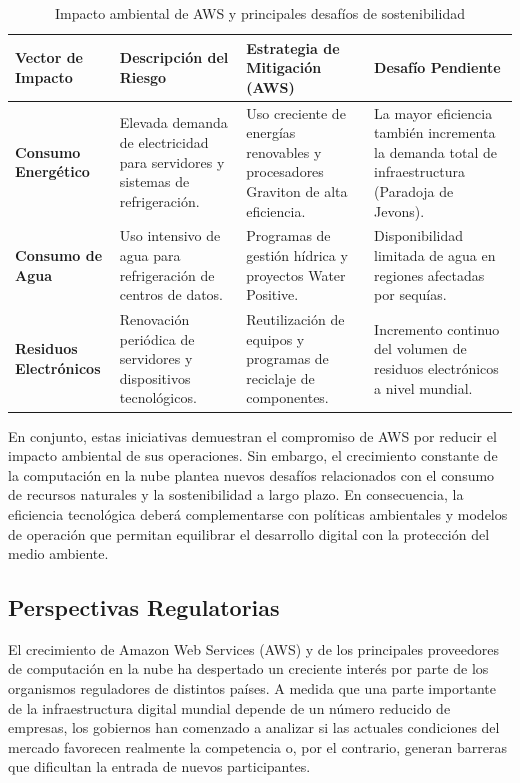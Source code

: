 \documentclass[12pt,a4paper]{article}
\begin{document}
\begin{table}[H]
\centering
\renewcommand{\arraystretch}{1.5}
\caption{Impacto ambiental de AWS y principales desafíos de sostenibilidad}
\label{tab:impacto_ambiental}
\begin{tabular}{>{\centering\arraybackslash}p{3cm} p{5cm} p{4.5cm} p{3.5cm}}
\toprule
\textbf{Vector de Impacto} &
\textbf{Descripción del Riesgo} &
\textbf{Estrategia de Mitigación (AWS)} &
\textbf{Desafío Pendiente} \\
\midrule

\textbf{Consumo Energético} &
Elevada demanda de electricidad para servidores y sistemas de refrigeración. &
Uso creciente de energías renovables y procesadores Graviton de alta eficiencia. &
La mayor eficiencia también incrementa la demanda total de infraestructura (Paradoja de Jevons). \\

\textbf{Consumo de Agua} &
Uso intensivo de agua para refrigeración de centros de datos. &
Programas de gestión hídrica y proyectos Water Positive. &
Disponibilidad limitada de agua en regiones afectadas por sequías. \\

\textbf{Residuos Electrónicos} &
Renovación periódica de servidores y dispositivos tecnológicos. &
Reutilización de equipos y programas de reciclaje de componentes. &
Incremento continuo del volumen de residuos electrónicos a nivel mundial. \\

\bottomrule
\end{tabular}
\end{table}

En conjunto, estas iniciativas demuestran el compromiso de AWS por reducir el impacto ambiental de sus operaciones. Sin embargo, el crecimiento constante de la computación en la nube plantea nuevos desafíos relacionados con el consumo de recursos naturales y la sostenibilidad a largo plazo. En consecuencia, la eficiencia tecnológica deberá complementarse con políticas ambientales y modelos de operación que permitan equilibrar el desarrollo digital con la protección del medio ambiente.\parencite{climate_pledge_2019,alcott2005jevons}


\subsection{Perspectivas Regulatorias}
El crecimiento de Amazon Web Services (AWS) y de los principales proveedores de computación en la nube ha despertado un creciente interés por parte de los organismos reguladores de distintos países. A medida que una parte importante de la infraestructura digital mundial depende de un número reducido de empresas, los gobiernos han comenzado a analizar si las actuales condiciones del mercado favorecen realmente la competencia o, por el contrario, generan barreras que dificultan la entrada de nuevos participantes.\parencite{cma2025,eu_data_act_2023,eu_dma_2022}
\end{document}
